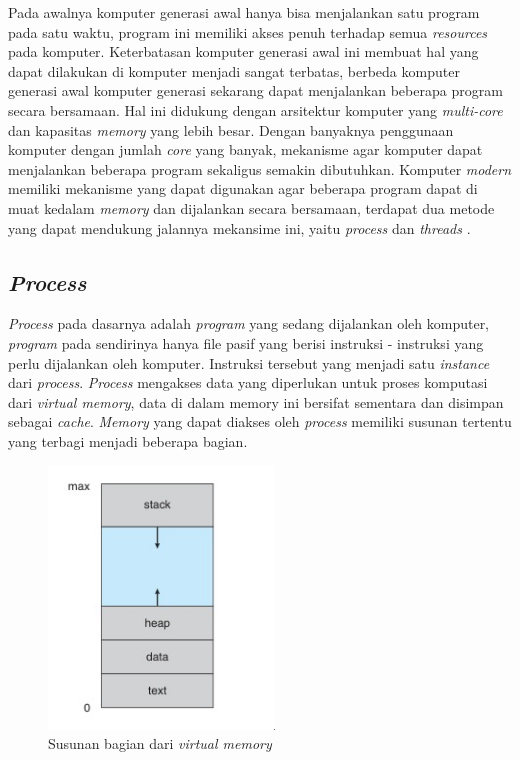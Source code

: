 Pada awalnya komputer generasi awal hanya bisa menjalankan satu program pada satu waktu, program ini memiliki akses penuh terhadap semua \emph{resources} pada komputer. Keterbatasan komputer generasi awal ini membuat hal yang dapat dilakukan di komputer menjadi sangat terbatas, berbeda komputer generasi awal komputer generasi sekarang dapat menjalankan beberapa program secara bersamaan. Hal ini didukung dengan arsitektur komputer yang \emph{multi-core} dan kapasitas \emph{memory} yang lebih besar. Dengan banyaknya penggunaan komputer dengan jumlah \emph{core} yang banyak, mekanisme agar komputer dapat menjalankan beberapa program sekaligus semakin dibutuhkan. Komputer \emph{modern} memiliki mekanisme yang dapat digunakan agar beberapa program dapat di muat kedalam \emph{memory} dan dijalankan secara bersamaan, terdapat dua metode yang dapat mendukung jalannya mekansime ini, yaitu \emph{process} dan \emph{threads} \citep{operatingsystemconcept}.

\subsection{\emph{Process}}

\emph{Process} pada dasarnya adalah \emph{program} yang sedang dijalankan oleh komputer, \emph{program} pada sendirinya hanya file pasif yang berisi instruksi - instruksi yang perlu dijalankan oleh komputer. Instruksi tersebut yang menjadi satu \emph{instance} dari \emph{process}. \emph{Process} mengakses data yang diperlukan untuk proses komputasi dari \emph{virtual memory}, data di dalam memory ini bersifat sementara dan disimpan sebagai \emph{cache}. \emph{Memory} yang dapat diakses oleh \emph{process} memiliki susunan tertentu yang terbagi menjadi beberapa bagian.
\begin{figure}[H]
	\centering
	\includegraphics[keepaspectratio, width=6cm]{gambar/memory-layout.jpeg}
  \caption{Susunan bagian dari \emph{virtual memory} \citep{operatingsystemconcept}}
	\label{gambar:memory_layout}
\end{figure}


